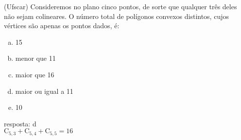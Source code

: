 \begin{ex}
 (Ufscar) Consideremos no plano cinco pontos, de sorte que  qualquer três  deles não sejam colineares. O número total de polígonos convexos distintos, cujos vértices são apenas os pontos dados, é:
    \begin{enumerate}[(a)]
    \item 15
    \item menor que 11
    \item maior que 16
    \item maior ou igual a 11
    \item 10
    \end{enumerate}
      \begin{sol}
       resposta: d \\
       $\mathrm{C}_{5,3}+\mathrm{C}_{5,4}+\mathrm{C}_{5,5}=16$
      \end{sol}
\end{ex}